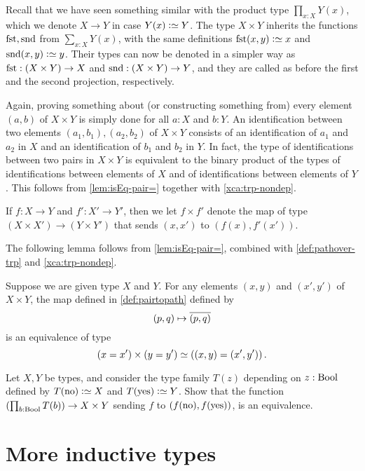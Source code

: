 Recall that we have seen something similar with the product type
$\prod_{x:X} Y(x)$, which we denote $X\to Y$ in case $Y(x)\defeq Y$.
The type $X \times Y$ inherits the functions $\fst,\snd$ from
$\sum_{x:X} Y(x)$, with the same definitions $\fst(x,y)\defeq x$
and $\snd(x,y)\defeq y$. Their types can now be denoted in a
simpler way as $\fst: (X \times Y)\to X$ and
$\snd: (X \times Y)\to Y$, and they are called as before the
first and the second projection, respectively.

Again, proving something about (or constructing something from) every
element $(a,b)$ of $X \times Y$ is simply done for all $a:X$ and $b:Y$.
An identification between two elements $(a_1,b_1),(a_2,b_2)$ of
$X \times Y$ consists of an identification of $a_1$ and $a_2$ in $X$
and an identification of $b_1$ and $b_2$ in $Y$. In fact, the type of identifications between two pairs in $X \times Y$
is equivalent to the binary product of the types of identifications between
elements of $X$ and of identifications between elements of $Y$.
This follows from \cref{lem:isEq-pair=} together with
\cref{xca:trp-nondep}.

If $f: X \to Y$ and $f': X' \to Y'$, then we let
$f\times f'$ denote the map of type $(X\times X') \to (Y\times Y')$
that sends $(x,x')$ to $(f(x),f'(x'))$.

The following lemma follows from \cref{lem:isEq-pair=}, combined with \cref{def:pathover-trp} and \cref{xca:trp-nondep}.

\begin{lemma}\label{lem:isEq-pair-bin=}
  Suppose we are given type $X$ and $Y$.
  For any elements $(x,y)$ and $(x',y')$ of $X \times Y$,
  the map defined in \cref{def:pairtopath} defined by
  \[
    (p,q) \mapsto \overline{({p},{q})}
  \]
  is an equivalence of type
  \[
    ( x = x' ) \times (y = y') \simeq \left( (x,y) = (x',y') \right).
  \]
\end{lemma}

\begin{xca}\label{xca:binary-prod-equiv}
  Let $X,Y$ be types, and consider the type family
  $T(z)$ depending on $z:\mathrm{Bool}$ defined by
  $T(\no)\defeq X$ and $T(\yes) \defeq Y$.
  Show that the function $(\prod_{b:\mathrm{Bool}}T(b))\to X\times Y$
  sending $f$ to $(f(\mathrm{no}),f(\mathrm{yes}))$, is an equivalence.
\end{xca}

\section{More inductive types}
\label{sec:inductive-types}

